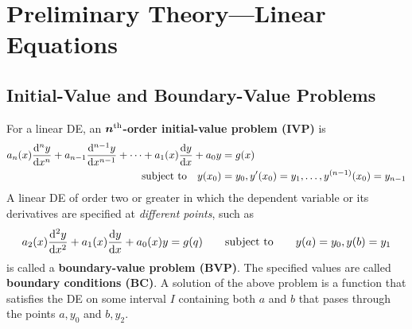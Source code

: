 \documentclass[./Differential Equations]{subfiles}
\begin{document}
	\section{Preliminary Theory---Linear Equations}	
		\subsection{Initial-Value and Boundary-Value Problems}
				For a linear DE, an \textbf{\(\bm{n^{\text{th}}}\)-order initial-value problem (IVP)} is
				\begin{align*}
					a_n(x)\dv[n]{y}{x} + a_{n - 1}\dv[n - 1]{y}{x} + \cdots + a_1(x)\dv{y}{x} + a_0y &= g(x) \\ 
					\text{subject to} \quad y(x_0) &= y_0, y'(x_0) = y_1, \ldots, y^{(n - 1)}(x_0) = y_{n - 1}
				\end{align*}
				A linear DE of order two or greater in which the dependent variable or its derivatives are specified at \textit{different points}, such as
				\[a_2(x)\dv[2]{y}{x} + a_1(x)\dv{y}{x} + a_0(x)y = g(q) \qquad \text{subject to} \qquad y(a) = y_0, y(b) = y_1\]
				is called a \textbf{boundary-value problem (BVP)}. The specified values are called \textbf{boundary conditions (BC)}. A solution of the above problem is a function that satisfies the DE on some interval \(I\) containing both \(a\) and \(b\) that pases through the points \(a, y_0\) and \(b, y_2\).
\end{document}
